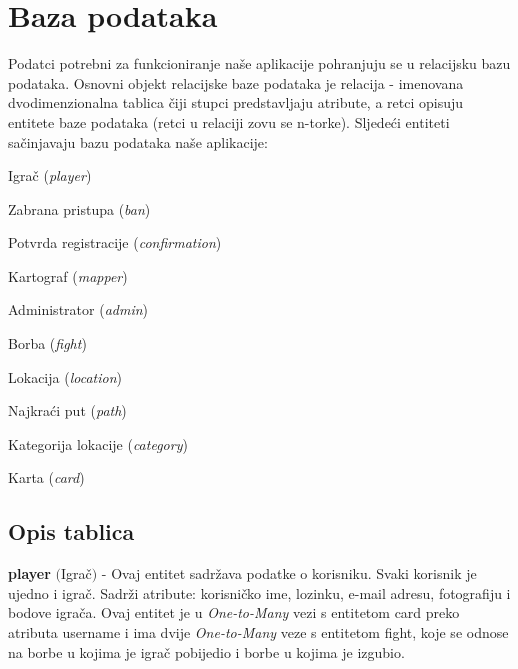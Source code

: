 				
		\section{Baza podataka}
			
			Podatci potrebni za funkcioniranje naše aplikacije pohranjuju se u relacijsku bazu podataka. Osnovni objekt relacijske baze podataka je relacija - imenovana dvodimenzionalna tablica čiji stupci predstavljaju atribute, a retci opisuju entitete baze podataka (retci u relaciji zovu se n-torke).
			Sljedeći entiteti sačinjavaju bazu podataka naše aplikacije:
			\begin{packed_item}
				\item Igrač (\textit{player})
				\item Zabrana pristupa (\textit{ban})
				\item Potvrda registracije (\textit{confirmation})
				\item Kartograf (\textit{mapper})
				\item Administrator (\textit{admin})
				\item Borba (\textit{fight})
				\item Lokacija (\textit{location})
				\item Najkraći put (\textit{path})
				\item Kategorija lokacije (\textit{category})
				\item Karta (\textit{card})
			\end{packed_item}
			
			\subsection{Opis tablica}
			
				\noindent\textbf{player} $($Igrač$)$ - Ovaj entitet sadržava podatke o korisniku. Svaki korisnik je ujedno i igrač. Sadrži atribute: korisničko ime, lozinku, e-mail adresu, fotografiju i bodove igrača. Ovaj entitet je u \textit{One-to-Many} vezi s entitetom card preko atributa username i ima dvije \textit{One-to-Many} veze s entitetom fight, koje se odnose na borbe u kojima je igrač pobijedio i borbe u kojima je izgubio. 
				
